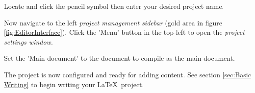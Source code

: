 Locate and click the pencil symbol then enter your desired project name.

Now navigate to the left \textit{project management sidebar} (gold area in figure \ref{fig:EditorInterface}). Click the 'Menu' button in the top-left to open the \textit{project  settings window}.

\begin{minipage}{\linewidth}
\centering
{}
\end{minipage}

Set the 'Main document' to the  document to compile  as the main document.
\par
The project is now configured and ready for adding content. See section \ref{sec:Basic Writing} to begin writing your \LaTeX\ project.
